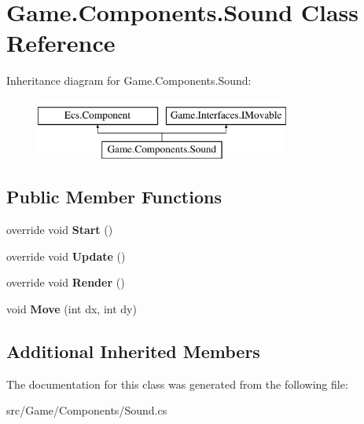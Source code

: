 \hypertarget{class_game_1_1_components_1_1_sound}{}\section{Game.\+Components.\+Sound Class Reference}
\label{class_game_1_1_components_1_1_sound}
Inheritance diagram for Game.\+Components.\+Sound\+:\begin{figure}[H]
\begin{center}
\leavevmode
\includegraphics[height=2.000000cm]{class_game_1_1_components_1_1_sound}
\end{center}
\end{figure}
\subsection*{Public Member Functions}
\begin{DoxyCompactItemize}
\item 
\mbox{\label{class_game_1_1_components_1_1_sound_abd2895a930b17f9f5c9be789b1e8435c}} 
override void {\bfseries Start} ()
\item 
\mbox{\label{class_game_1_1_components_1_1_sound_a814b11a6bfb40260d91e4b39f74ccd6f}} 
override void {\bfseries Update} ()
\item 
\mbox{\label{class_game_1_1_components_1_1_sound_afbb7ad1658564bbd716c9770b565dbe1}} 
override void {\bfseries Render} ()
\item 
\mbox{\label{class_game_1_1_components_1_1_sound_ad41d2930349a5ddc1d46955b630b19e5}} 
void {\bfseries Move} (int dx, int dy)
\end{DoxyCompactItemize}
\subsection*{Additional Inherited Members}


The documentation for this class was generated from the following file\+:\begin{DoxyCompactItemize}
\item 
src/\+Game/\+Components/Sound.\+cs\end{DoxyCompactItemize}
